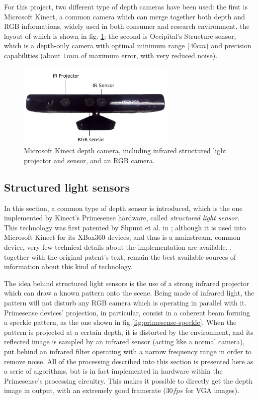 For this project, two different type of depth cameras have been used: the first
is Microsoft Kinect, a common camera which can merge together both depth and RGB
informations, widely used in both consumer and research environment,
the layout of which is shown in fig. \ref{fig:kinect}; the second is Occipital's
Structure sensor, which is a depth-only camera with optimal minimum range
($40\unit{cm}$) and precision capabilities (about $1\unit{mm}$ of maximum error,
with very reduced noise).

\begin{figure}[htbp]
\centering
\includegraphics[width=3in]{./Graphics/kinect}
\caption{Microsoft Kinect depth camera, including infrared structured light
projector and sensor, and an RGB camera.\label{fig:kinect}}
\end{figure}

\subsection{Structured light sensors}
In this section, a common type of depth sensor is introduced, which is the one
implemented by Kinect's Primesense hardware, called \emph{structured light
sensor}. This technology was first patented by Shpunt et al. in
\cite{primesense-patent}; although it is used into Microsoft Kinect for its
XBox360 devices, and thus is a mainstream, common device, very few technical
details about the implementation are available. \cite{how-kinect-work}, together
with the original patent's text, remain the best available sources of
information about this kind of technology.

The idea behind structured light sensors is the use of a strong infrared projector
which can draw a known pattern onto the scene. Being made of infrared light,
the pattern will not disturb any RGB camera which is operating in parallel with
it. Primesense devices' projection, in particular, consist in a coherent beam
forming a speckle pattern, as the one shown
in fig.\ref{fig:primesense-speckle}. When the pattern is projected at a certain
depth, it is distorted by the environment, and its reflected image is sampled
by an infrared sensor (acting like a normal camera), put behind an infrared
filter operating with a narrow frequency range in order to remove noise. All of
the processing described into this section is presented here as a serie of
algorithms, but is in fact implemented in hardware within the Primesense's
processing circuitry. This makes it possible to directly get the depth image in
output, with an extremely good framerate ($30\unit{fps}$ for VGA images).


